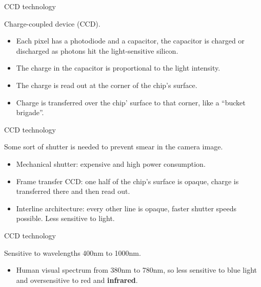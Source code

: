 \documentclass[compress]{beamer}
\begin{document}
\begin{frame}{CCD technology}

Charge-coupled device (CCD).

\begin{itemize}

\item
  Each pixel has a photodiode and a capacitor, the capacitor is charged
  or discharged as photons hit the light-sensitive silicon.
\item
  The charge in the capacitor is proportional to the light intensity.
\item
  The charge is read out at the corner of the chip's surface.
\item
  Charge is transferred over the chip' surface to that corner, like a
  ``bucket brigade''.
\end{itemize}

\end{frame}

\begin{frame}{CCD technology}

Some sort of shutter is needed to prevent smear in the camera image.

\begin{itemize}

\item
  Mechanical shutter: expensive and high power consumption.
\item
  Frame transfer CCD: one half of the chip's surface is opaque, charge
  is transferred there and then read out.
\item
  Interline architecture: every other line is opaque, faster shutter
  speeds possible. Less sensitive to light.
\end{itemize}

\end{frame}

\begin{frame}{CCD technology}

Sensitive to wavelengths 400nm to 1000nm.

\begin{itemize}

\item
  Human visual spectrum from 380nm to 780nm, so less sensitive to blue
  light and oversensitive to red and \textbf{infrared}.
\end{itemize}

\end{frame}
\end{document}
